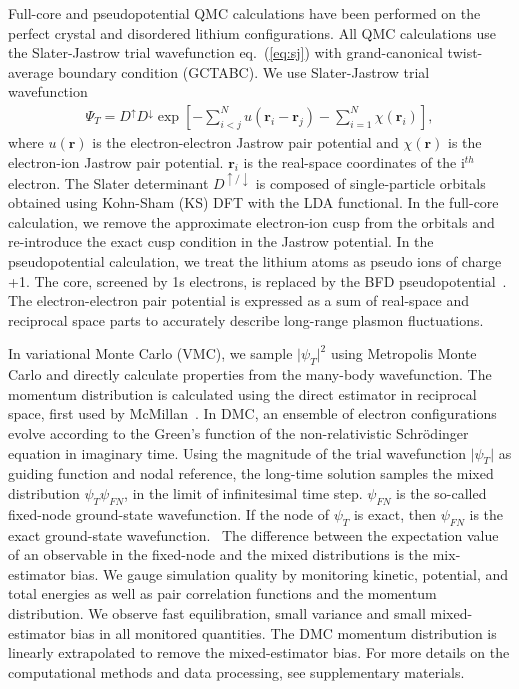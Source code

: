 \documentclass[aps,prb,showpacs,preprintnumbers,amsmath,amssymb,superscriptaddress,twocolumn]{revtex4}
\newcommand{\bs}{\boldsymbol}
\newcommand{\up}{\uparrow}
\newcommand{\down}{\downarrow}
\begin{document}
Full-core and pseudopotential QMC calculations have been performed on the perfect crystal and disordered lithium configurations. All QMC calculations use the Slater-Jastrow trial wavefunction eq.~(\ref{eq:sj}) with grand-canonical twist-average boundary condition (GCTABC). We use Slater-Jastrow trial wavefunction
\begin{align}
\Psi_T = D^{\up} D^{\down} \exp\left[ -\sum\limits_{i<j}^{N} u(\bs{r}_i-\bs{r}_j) - \sum\limits_{i=1}^N \chi(\bs{r}_i) \right],\label{eq:sj}
\end{align}
where $u(\bs{r})$ is the electron-electron Jastrow pair potential and $\chi(\bs{r})$ is the electron-ion Jastrow pair potential. $\bs{r}_i$ is the real-space coordinates of the i$^{th}$ electron. The Slater determinant $D^{\up/\down}$ is composed of single-particle orbitals obtained using Kohn-Sham (KS) DFT with the LDA functional. In the full-core calculation, we remove the approximate electron-ion cusp from the orbitals and re-introduce the exact cusp condition in the Jastrow potential. In the pseudopotential calculation, we treat the lithium atoms as pseudo ions of charge +1. The core, screened by 1s electrons, is replaced by the BFD pseudopotential~\cite{Burkatzki2007}.  The electron-electron pair potential is expressed as a sum of real-space and reciprocal space parts to accurately describe long-range plasmon fluctuations.

In variational Monte Carlo (VMC), we sample $\vert \psi_T \vert^2$ using Metropolis Monte Carlo and directly calculate properties from the many-body wavefunction. The momentum distribution is calculated using the direct estimator in reciprocal space, first used by McMillan~\cite{W.L.McMillan1965}. In DMC, an ensemble of electron configurations evolve according to the Green's function of the non-relativistic Schr\"odinger equation in imaginary time. Using the magnitude of the trial wavefunction $\vert \psi_T\vert$ as guiding function and nodal reference, the long-time solution samples the mixed distribution $\psi_T\psi_{FN}$, in the limit of infinitesimal time step. $\psi_{FN}$ is the so-called fixed-node ground-state wavefunction. If the node of $\psi_T$ is exact, then $\psi_{FN}$ is the exact ground-state wavefunction.~\cite{Foulkes2001} The difference between the expectation value of an observable in the fixed-node and the mixed distributions is the mix-estimator bias. We gauge simulation quality by monitoring kinetic, potential, and total energies as well as pair correlation functions and the momentum distribution. We observe fast equilibration, small variance and small mixed-estimator bias in all monitored quantities. The DMC momentum distribution is linearly extrapolated to remove the mixed-estimator bias. For more details on the computational methods and data processing, see supplementary materials.
\end{document}
